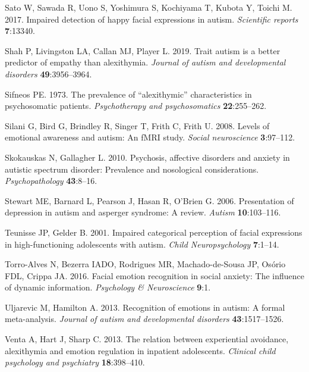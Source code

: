 \documentclass[
]{article}
\newlength{\cslhangindent}
\newlength{\cslentryspacingunit} %
\newenvironment{CSLReferences}[2] %
 {%
  \setlength{\parindent}{0pt}
  \ifodd #1
  \let\oldpar\par
  \def\par{\hangindent=\cslhangindent\oldpar}
  \fi
  \setlength{\parskip}{#2\cslentryspacingunit}
 }%
 {}
\begin{document}
\begin{CSLReferences}{1}{0}
\leavevmode{}%
Sato W, Sawada R, Uono S, Yoshimura S, Kochiyama T, Kubota Y, Toichi M. 2017. Impaired detection of happy facial expressions in autism. \emph{Scientific reports} \textbf{7}:13340.

\leavevmode{}%
Shah P, Livingston LA, Callan MJ, Player L. 2019. Trait autism is a better predictor of empathy than alexithymia. \emph{Journal of autism and developmental disorders} \textbf{49}:3956--3964.

\leavevmode{}%
Sifneos PE. 1973. The prevalence of {``alexithymic''} characteristics in psychosomatic patients. \emph{Psychotherapy and psychosomatics} \textbf{22}:255--262.

\leavevmode{}%
Silani G, Bird G, Brindley R, Singer T, Frith C, Frith U. 2008. Levels of emotional awareness and autism: An fMRI study. \emph{Social neuroscience} \textbf{3}:97--112.

\leavevmode{}%
Skokauskas N, Gallagher L. 2010. Psychosis, affective disorders and anxiety in autistic spectrum disorder: Prevalence and nosological considerations. \emph{Psychopathology} \textbf{43}:8--16.

\leavevmode{}%
Stewart ME, Barnard L, Pearson J, Hasan R, O'Brien G. 2006. Presentation of depression in autism and asperger syndrome: A review. \emph{Autism} \textbf{10}:103--116.

\leavevmode{}%
Teunisse JP, Gelder B. 2001. Impaired categorical perception of facial expressions in high-functioning adolescents with autism. \emph{Child Neuropsychology} \textbf{7}:1--14.

\leavevmode{}%
Torro-Alves N, Bezerra IADO, Rodrigues MR, Machado-de-Sousa JP, Osório FDL, Crippa JA. 2016. Facial emotion recognition in social anxiety: The influence of dynamic information. \emph{Psychology \& Neuroscience} \textbf{9}:1.

\leavevmode{}%
Uljarevic M, Hamilton A. 2013. Recognition of emotions in autism: A formal meta-analysis. \emph{Journal of autism and developmental disorders} \textbf{43}:1517--1526.

\leavevmode{}%
Venta A, Hart J, Sharp C. 2013. The relation between experiential avoidance, alexithymia and emotion regulation in inpatient adolescents. \emph{Clinical child psychology and psychiatry} \textbf{18}:398--410.


\end{CSLReferences}
\end{document}
